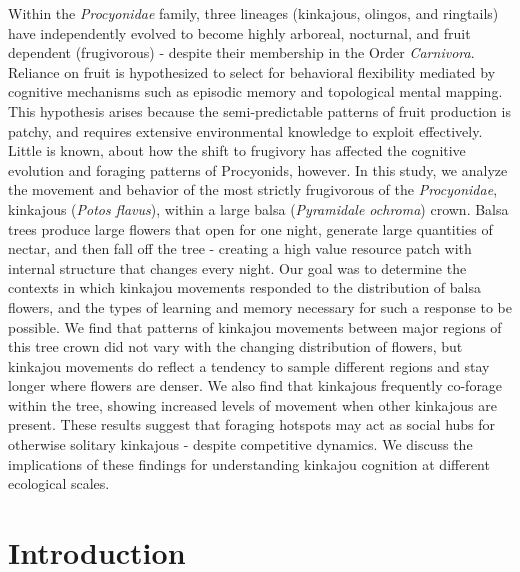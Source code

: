 \documentclass[twoside,12pt,final]{ucthesis-CA2012}
\begin{document}
\begin{ucmainmatter}
Within the \emph{Procyonidae} family, three lineages (kinkajous, olingos, and ringtails) have independently evolved to become highly arboreal, nocturnal, and fruit dependent (frugivorous) - despite their membership in the Order \emph{Carnivora}. Reliance on fruit is hypothesized to select for behavioral flexibility mediated by cognitive mechanisms such as episodic memory and topological mental mapping. This hypothesis arises because the semi-predictable patterns of fruit production is patchy, and requires extensive environmental knowledge to exploit effectively. Little is known, about how the shift to frugivory has affected the cognitive evolution and foraging patterns of Procyonids, however. In this study, we analyze the movement and behavior of the most strictly frugivorous of the \emph{Procyonidae}, kinkajous (\emph{Potos flavus}), within a large balsa (\emph{Pyramidale ochroma}) crown. Balsa trees produce large flowers that open for one night, generate large quantities of nectar, and then fall off the tree - creating a high value resource patch with internal structure that changes every night. Our goal was to determine the contexts in which kinkajou movements responded to the distribution of balsa flowers, and the types of learning and memory necessary for such a response to be possible. We find that patterns of kinkajou movements between major regions of this tree crown did not vary with the changing distribution of flowers, but kinkajou movements do reflect a tendency to sample different regions and stay longer where flowers are denser. We also find that kinkajous frequently co-forage within the tree, showing increased levels of movement when other kinkajous are present. These results suggest that foraging hotspots may act as social hubs for otherwise solitary kinkajous - despite competitive dynamics. We discuss the implications of these findings for understanding kinkajou cognition at different ecological scales.

\hypertarget{introduction-2}{%
\section{Introduction}\label{introduction-2}}


\end{ucmainmatter}
\end{document}
